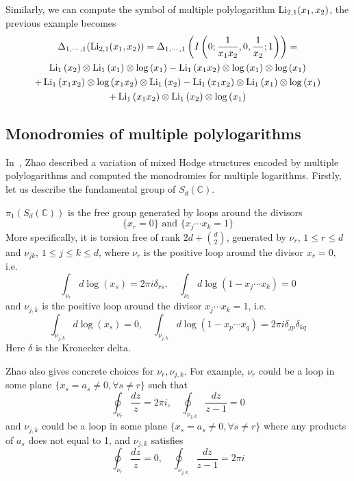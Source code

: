 \begin{example}\label{ex: symbol of Li_{2,1}(x_1,x_2)}
Similarly, we can compute the symbol of multiple polylogarithm $\operatorname{Li}_{2,1}(x_1,x_2)$, the previous example becomes
\begin{multline}
\Delta_{1,\cdots,1}(\operatorname{Li}_{2,1}(x_1,x_2))=\Delta_{1,\cdots,1}\left(I\left(0;\frac{1}{x_1x_2},0,\frac{1}{x_2};1\right)\right)=\\
\operatorname{Li}_1\left(x_2\right)\otimes \operatorname{Li}_1\left(x_1\right)\otimes \log\left(x_1\right)-\operatorname{Li}_1\left(x_1 x_2\right)\otimes \log \left(x_1\right)\otimes \log
   \left(x_1\right)\\
+\operatorname{Li}_1\left(x_1 x_2\right)\otimes \log \left(x_1 x_2\right)\otimes \operatorname{Li}_1\left(x_2\right)-\operatorname{Li}_1\left(x_1 x_2\right)\otimes
   \operatorname{Li}_1\left(x_1\right)\otimes \log \left(x_1\right)\\
+\operatorname{Li}_1\left(x_1 x_2\right)\otimes \operatorname{Li}_1\left(x_2\right)\otimes \log \left(x_1\right)
\end{multline}
\end{example}

\subsection{Monodromies of multiple polylogarithms}\label{sec: Zhao's calc on monodromy of multiple logarithms}

In~\cite{Zhao_MultipleZetaFunctionsMultiplePolylogarithmsAndTheirSpecialValues}, Zhao described a variation of mixed Hodge structures encoded by multiple polylogarithms and computed the monodromies for multiple logarithms. Firstly, let us describe the fundamental group of $S_d(\mathbb C)$.

\begin{theorem}
$\pi_1(S_d(\mathbb C))$ is the free group generated by loops around the divisors
\[
\{x_r=0\}\text{ and }\{x_j\cdots x_k=1\}
\]
More specifically, it is torsion free of rank $2d+\binom{d}{2}$, generated by $\nu_r$, $1\leq r\leq d$ and $\nu_{jk}$, $1\leq j\leq k\leq d$, where $\nu_r$ is the positive loop around the divisor $x_r=0$, i.e.
\[
\int_{\nu_r}d\log(x_s)=2\pi i\delta_{rs},\quad\int_{\nu_i}d\log(1-x_j\cdots x_k)=0
\]
and $\nu_{j,k}$ is the positive loop around the divisor $x_j\cdots x_k=1$, i.e.
\[
\int_{\nu_{j,k}}d\log(x_s)=0,\quad\int_{\nu_{j,k}}d\log(1-x_p\cdots x_q)=2\pi i\delta_{jp}\delta_{kq}
\]
Here $\delta$ is the Kronecker delta.
\end{theorem}

Zhao also gives concrete choices for $\nu_r,\nu_{j,k}$. For example, $\nu_r$ could be a loop in some plane $\{x_s=a_s\neq 0,\forall s\neq r\}$ such that
\[
\oint_{\nu_r}\dfrac{dz}{z}=2\pi i,\quad\oint_{\nu_{j,k}}\dfrac{dz}{z-1}=0
\]
and $\nu_{j,k}$ could be a loop in some plane $\{x_s=a_s\neq 0,\forall s\neq r\}$ where any products of $a_s$ does not equal to 1, and $\nu_{j,k}$ satisfies
\[
\oint_{\nu_r}\dfrac{dz}{z}=0,\quad\oint_{\nu_{j,k}}\dfrac{dz}{z-1}=2\pi i
\]

